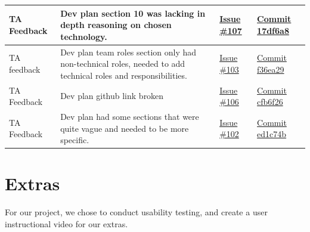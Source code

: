 \documentclass{article}
\begin{document}
\begin{landscape}
\begin{tabularx}{\linewidth}{|P{2.3cm}|Y|P{2.5cm}|P{3.5cm}|}
        \hline
        \endlastfoot

        \hline
        TA Feedback &
        Dev plan section 10 was lacking in depth reasoning on chosen technology. &
        \href{https://github.com/AlgoCatan/RLCatan/issues/107}{Issue \#107} &
        \href{https://github.com/AlgoCatan/RLCatan/commit/17df6a875e2daf9593172d54ea6349b9e91b1b13}{Commit 17df6a8} \\

        \hline 
        TA feedback &
        Dev plan team roles section only had non-technical roles, needed to add technical roles and responsibilities. &
        \href{https://github.com/AlgoCatan/RLCatan/issues/103}{Issue \#103} &
        \href{https://github.com/AlgoCatan/RLCatan/commit/f36ea29b421791adf8f59048a9ed70f8585e3fbe}{Commit f36ea29} \\

        \hline
        TA Feedback &
        Dev plan github link broken &
        \href{https://github.com/AlgoCatan/RLCatan/issues/106}{Issue \#106} &
        \href{https://github.com/AlgoCatan/RLCatan/commit/cfb6f26f563faffae4ecefe95e42facae1f7722c}{Commit cfb6f26} \\

        \hline 
        TA Feedback &
        Dev plan had some sections that were quite vague and needed to be more specific. &
        \href{https://github.com/AlgoCatan/RLCatan/issues/102}{Issue \#102} &
        \href{https://github.com/AlgoCatan/RLCatan/commit/ed1c74be1ecb4a3d0881631fef73d4841a21f715}{Commit ed1c74b} \\

\end{tabularx}



\end{landscape}

\section{Extras}


For our project, we chose to conduct usability testing, and create a user instructional video for our extras.
\end{document}
